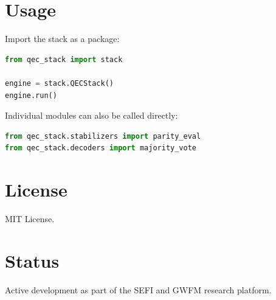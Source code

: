 \documentclass[11pt]{article}
\begin{document}
\section{Usage}

Import the stack as a package:

\begin{lstlisting}[language=Python]
from qec_stack import stack

engine = stack.QECStack()
engine.run()
\end{lstlisting}

Individual modules can also be called directly:

\begin{lstlisting}[language=Python]
from qec_stack.stabilizers import parity_eval
from qec_stack.decoders import majority_vote
\end{lstlisting}

\section{License}

MIT License.

\section{Status}

Active development as part of the SEFI and GWFM research platform.
\end{document}

